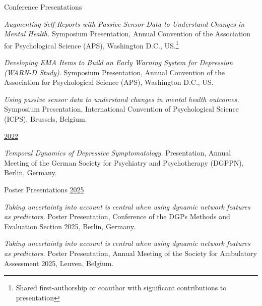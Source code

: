 \documentclass{resume} %
\newcommand\publication[1]{%
	\smallskip\par\hangpara{1.5em}{1}\bibentry{#1}\smallskip
}
\begin{document}
\begin{rSection}{Conference Presentations}
\begin{etaremune}
\item \textit{Augmenting Self-Reports with Passive Sensor Data to Understand Changes in Mental Health.} Symposium Presentation, Annual Convention of the Association for Psychological Science (APS), Washington D.C., US.\footnote{Shared first-authorship or coauthor with significant contributions to presentation\label{refnote}}

\item \textit{Developing EMA Items to Build an Early Warning System for Depression (WARN-D Study).} Symposium Presentation, Annual Convention of the Association for Psychological Science (APS), Washington D.C., US.

\item \textit{Using passive sensor data to understand changes in mental health outcomes.} Symposium Presentation, International Convention of Psychological Science (ICPS), Brussels, Belgium.

\hspace{-0.75cm}\underline{2022}

\item \textit{Temporal Dynamics of Depressive Symptomatology.} Presentation, Annual Meeting of the German Society for Psychiatry and Psychotherapy (DGPPN), Berlin, Germany. 



\end{etaremune}
\end{rSection}

\begin{rSection}{Poster Presentations}
\underline{2025} 
\begin{etaremune}
\item \textit{Taking uncertainty into account is central when using dynamic network features as predictors.} Poster Presentation, Conference of the DGPs Methods and Evaluation Section 2025, Berlin, Germany.
\item \textit{Taking uncertainty into account is central when using dynamic network features as predictors.} Poster Presentation, Annual Meeting of the Society for Ambulatory Assessment 2025, Leuven, Belgium.
\end{etaremune}
\end{rSection}
\end{document}
